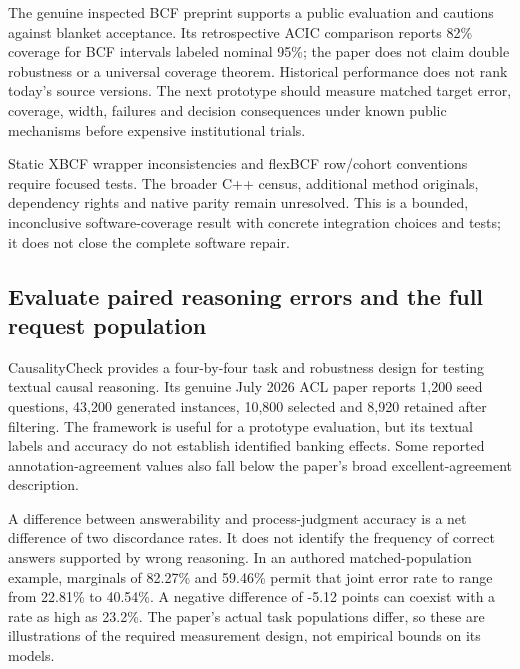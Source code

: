 The genuine inspected BCF preprint supports a public evaluation and
cautions against blanket acceptance. Its retrospective ACIC comparison
reports 82\% coverage for BCF intervals labeled nominal 95\%; the paper
does not claim double robustness or a universal coverage theorem.
Historical performance does not rank today's source versions. The next
prototype should measure matched target error, coverage, width, failures
and decision consequences under known public mechanisms before expensive
institutional trials. \citep{exec21_cxx_hahn}

Static XBCF wrapper inconsistencies and flexBCF row/cohort conventions
require focused tests. The broader C++ census, additional method
originals, dependency rights and native parity remain unresolved. This
is a bounded, inconclusive software-coverage result with concrete
integration choices and tests; it does not close the complete software
repair. \citep{exec21_cxx_xbcf,exec21_cxx_flexbcf}

\hypertarget{evaluate-paired-reasoning-errors-and-the-full-request-population}{%
\subsection{Evaluate paired reasoning errors and the full request
population}\label{evaluate-paired-reasoning-errors-and-the-full-request-population}}

CausalityCheck provides a four-by-four task and robustness design for
testing textual causal reasoning. Its genuine July 2026 ACL paper
reports 1,200 seed questions, 43,200 generated instances, 10,800
selected and 8,920 retained after filtering. The framework is useful for
a prototype evaluation, but its textual labels and accuracy do not
establish identified banking effects. Some reported annotation-agreement
values also fall below the paper's broad excellent-agreement
description. \citep{exec21_causalitycheck}

A difference between answerability and process-judgment accuracy is a
net difference of two discordance rates. It does not identify the
frequency of correct answers supported by wrong reasoning. In an
authored matched-population example, marginals of 82.27\% and 59.46\%
permit that joint error rate to range from 22.81\% to 40.54\%. A
negative difference of -5.12 points can coexist with a rate as high as
23.2\%. The paper's actual task populations differ, so these are
illustrations of the required measurement design, not empirical bounds
on its models. \citep{exec21_causalitycheck_reference}

